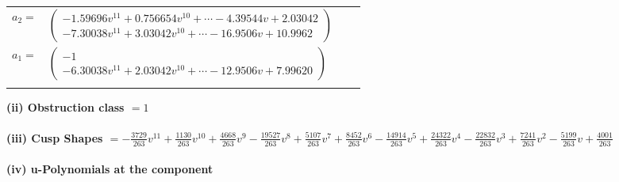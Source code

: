 \documentclass[1p]{elsarticle_modified}
\theoremstyle{definition}
\begin{document}
\begin{tabular}{m{7pt} m{180pt} m{7pt} m{180pt} }
\flushright $a_{2}=$&$\begin{pmatrix}-1.59696 v^{11}+0.756654 v^{10}+\cdots-4.39544 v+2.03042\\-7.30038 v^{11}+3.03042 v^{10}+\cdots-16.9506 v+10.9962\end{pmatrix}$ \\
\flushright $a_{1}=$&$\begin{pmatrix}-1\\-6.30038 v^{11}+2.03042 v^{10}+\cdots-12.9506 v+7.99620\end{pmatrix}$\\&\end{tabular}
\flushleft \textbf{(ii) Obstruction class $= 1$}\\~\\
\flushleft \textbf{(iii) Cusp Shapes $= -\frac{3729}{263} v^{11}+\frac{1130}{263} v^{10}+\frac{4668}{263} v^9-\frac{19527}{263} v^8+\frac{5107}{263} v^7+\frac{8452}{263} v^6-\frac{14914}{263} v^5+\frac{24322}{263} v^4-\frac{22832}{263} v^3+\frac{7241}{263} v^2-\frac{5199}{263} v+\frac{4001}{263}$}\\~\\
\newpage\renewcommand{\arraystretch}{1}
\flushleft \textbf{(iv) u-Polynomials at the component}\newline \\
\end{document}
